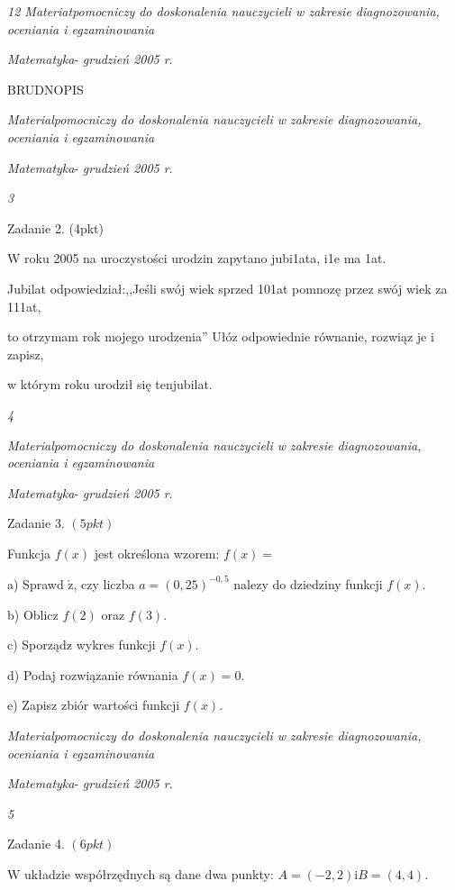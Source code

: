 \documentclass[a4paper,12pt]{article}
\begin{document}
{\it 12 Materiatpomocniczy do doskonalenia nauczycieli w zakresie diagnozowania, oceniania i egzaminowania}

{\it Matematyka}- {\it grudzień 2005 r}.

BRUDNOPIS





{\it Materialpomocniczy do doskonalenia nauczycieli w zakresie diagnozowania, oceniania i egzaminowania}

{\it Matematyka}- {\it grudzień 2005 r}.

{\it 3}

Zadanie 2. (4pkt)

W roku 2005 na uroczystości urodzin zapytano jubi1ata, i1e ma 1at.

Jubilat odpowiedział:,,Jeśli swój wiek sprzed 101at pomnozę przez swój wiek za 111at,

to otrzymam rok mojego urodzenia'' Ułóz odpowiednie równanie, rozwiąz je i zapisz,

w którym roku urodził się tenjubilat.





{\it 4}

{\it Materialpomocniczy do doskonalenia nauczycieli w zakresie diagnozowania, oceniania i egzaminowania}

{\it Matematyka}- {\it grudzień 2005 r}.

Zadanie 3. $(5pkt)$

Funkcja $f(x)$ jest określona wzorem: $f(x)=$

a) Sprawd $\acute{\mathrm{z}}$, czy liczba $a=(0,25)^{-0,5}$ nalezy do dziedziny funkcji $f(x).$

b) Oblicz $f(2)$ oraz $f(3).$

c) Sporządz$\acute{}$ wykres funkcji $f(x).$

d) Podaj rozwiązanie równania $f(x)=0.$

e) Zapisz zbiór wartości funkcji $f(x).$





{\it Materialpomocniczy do doskonalenia nauczycieli w zakresie diagnozowania, oceniania i egzaminowania}

{\it Matematyka}- {\it grudzień 2005 r}.

{\it 5}

Zadanie 4. $(6pkt)$

$\mathrm{W}$ układzie współrzędnych są dane dwa punkty: $A=(-2,2)\mathrm{i}B=(4,4).$
\end{document}
